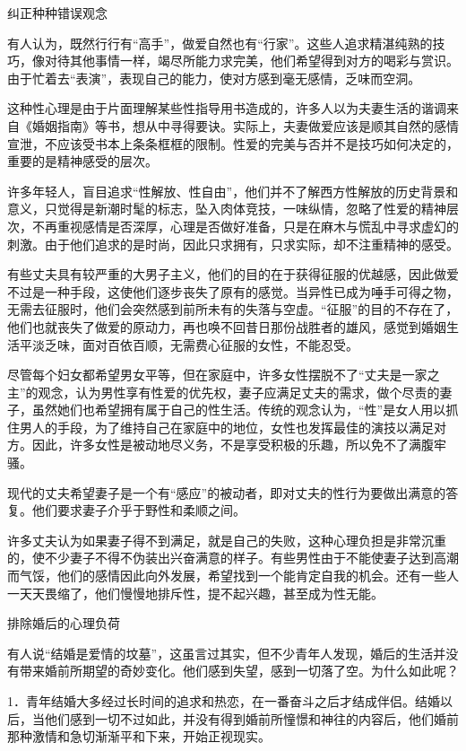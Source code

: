 \documentclass[12pt,UTF8]{ctexbook}
\begin{document}
纠正种种错误观念


有人认为，既然行行有“高手”，做爱自然也有“行家”。这些人追求精湛纯熟的技巧，像对待其他事情一样，竭尽所能力求完美，他们希望得到对方的喝彩与赏识。由于忙着去“表演”，表现自己的能力，使对方感到毫无感情，乏味而空洞。

这种性心理是由于片面理解某些性指导用书造成的，许多人以为夫妻生活的谐调来自《婚姻指南》等书，想从中寻得要诀。实际上，夫妻做爱应该是顺其自然的感情宣泄，不应该受书本上条条框框的限制。性爱的完美与否并不是技巧如何决定的，重要的是精神感受的层次。

许多年轻人，盲目追求“性解放、性自由”，他们并不了解西方性解放的历史背景和意义，只觉得是新潮时髦的标志，坠入肉体竞技，一味纵情，忽略了性爱的精神层次，不再重视感情是否深厚，心理是否做好准备，只是在麻木与慌乱中寻求虚幻的刺激。由于他们追求的是时尚，因此只求拥有，只求实际，却不注重精神的感受。

有些丈夫具有较严重的大男子主义，他们的目的在于获得征服的优越感，因此做爱不过是一种手段，这使他们逐步丧失了原有的感觉。当异性已成为唾手可得之物，无需去征服时，他们会突然感到前所未有的失落与空虚。“征服”的目的不存在了，他们也就丧失了做爱的原动力，再也唤不回昔日那份战胜者的雄风，感觉到婚姻生活平淡乏味，面对百依百顺，无需费心征服的女性，不能忍受。

尽管每个妇女都希望男女平等，但在家庭中，许多女性摆脱不了“丈夫是一家之主”的观念，认为男性享有性爱的优先权，妻子应满足丈夫的需求，做个尽责的妻子，虽然她们也希望拥有属于自己的性生活。传统的观念认为，“性”是女人用以抓住男人的手段，为了维持自己在家庭中的地位，女性也发挥最佳的演技以满足对方。因此，许多女性是被动地尽义务，不是享受积极的乐趣，所以免不了满腹牢骚。

现代的丈夫希望妻子是一个有“感应”的被动者，即对丈夫的性行为要做出满意的答复。他们要求妻子介乎于野性和柔顺之间。

许多丈夫认为如果妻子得不到满足，就是自己的失败，这种心理负担是非常沉重的，使不少妻子不得不伪装出兴奋满意的样子。有些男性由于不能使妻子达到高潮而气馁，他们的感情因此向外发展，希望找到一个能肯定自我的机会。还有一些人一天天畏缩了，他们慢慢地排斥性，提不起兴趣，甚至成为性无能。





排除婚后的心理负荷


有人说“结婚是爱情的坟墓”，这虽言过其实，但不少青年人发现，婚后的生活并没有带来婚前所期望的奇妙变化。他们感到失望，感到一切落了空。为什么如此呢？

1．青年结婚大多经过长时间的追求和热恋，在一番奋斗之后才结成伴侣。结婚以后，当他们感到一切不过如此，并没有得到婚前所憧憬和神往的内容后，他们婚前那种激情和急切渐渐平和下来，开始正视现实。
\end{document}
